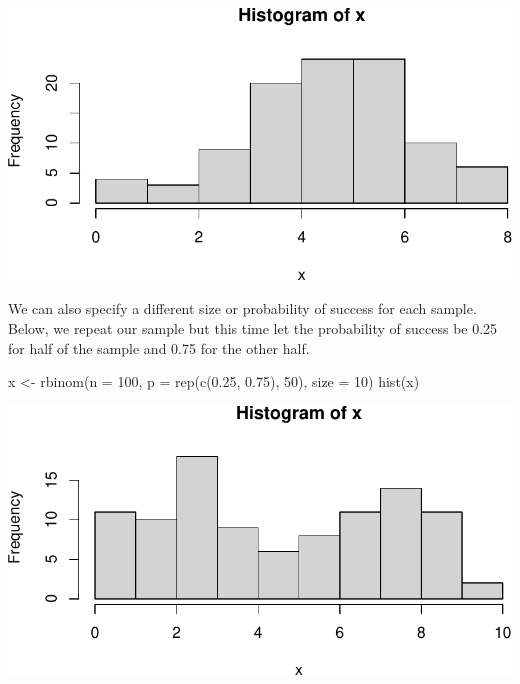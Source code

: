 \documentclass[
  letterpaper,
]{krantz}
\makeatletter
\newenvironment{Shaded}{\begin{snugshade}}{\end{snugshade}}
\newcommand{\AttributeTok}[1]{\textcolor[rgb]{0.40,0.45,0.13}{#1}}
\newcommand{\DecValTok}[1]{\textcolor[rgb]{0.68,0.00,0.00}{#1}}
\newcommand{\FloatTok}[1]{\textcolor[rgb]{0.68,0.00,0.00}{#1}}
\newcommand{\FunctionTok}[1]{\textcolor[rgb]{0.28,0.35,0.67}{#1}}
\newcommand{\NormalTok}[1]{\textcolor[rgb]{0.00,0.23,0.31}{#1}}
\newcommand{\OtherTok}[1]{\textcolor[rgb]{0.00,0.23,0.31}{#1}}
\newenvironment{kframe}{%
\medskip{}
\setlength{\fboxsep}{.8em}
 \def\at@end@of@kframe{}%
 \ifinner\ifhmode%
  \def\at@end@of@kframe{\end{minipage}}%
  \begin{minipage}{\columnwidth}%
 \fi\fi%
 \def\FrameCommand##1{\hskip\@totalleftmargin \hskip-\fboxsep
 \colorbox{shadecolor}{##1}\hskip-\fboxsep
     \hskip-\linewidth \hskip-\@totalleftmargin \hskip\columnwidth}%
 \MakeFramed {\advance\hsize-\width
   \@totalleftmargin\z@ \linewidth\hsize
   \@setminipage}}%
 {\par\unskip\endMakeFramed%
 \at@end@of@kframe}
\renewenvironment{Shaded}{\begin{kframe}}{\end{kframe}}
\makeatother
\begin{document}
\begin{center}
\includegraphics[width=1\textwidth,height=\textheight]{book/distributions_files/figure-pdf/unnamed-chunk-6-1.pdf}
\end{center}

We can also specify a different size or probability of success for each
sample. Below, we repeat our sample but this time let the probability of
success be 0.25 for half of the sample and 0.75 for the other half.

\begin{Shaded}
\begin{Highlighting}[]
\NormalTok{x }\OtherTok{\textless{}{-}} \FunctionTok{rbinom}\NormalTok{(}\AttributeTok{n =} \DecValTok{100}\NormalTok{, }\AttributeTok{p =} \FunctionTok{rep}\NormalTok{(}\FunctionTok{c}\NormalTok{(}\FloatTok{0.25}\NormalTok{, }\FloatTok{0.75}\NormalTok{), }\DecValTok{50}\NormalTok{), }\AttributeTok{size =} \DecValTok{10}\NormalTok{)}
\FunctionTok{hist}\NormalTok{(x)}
\end{Highlighting}
\end{Shaded}

\begin{center}
\includegraphics[width=1\textwidth,height=\textheight]{book/distributions_files/figure-pdf/unnamed-chunk-7-1.pdf}
\end{center}
\end{document}
